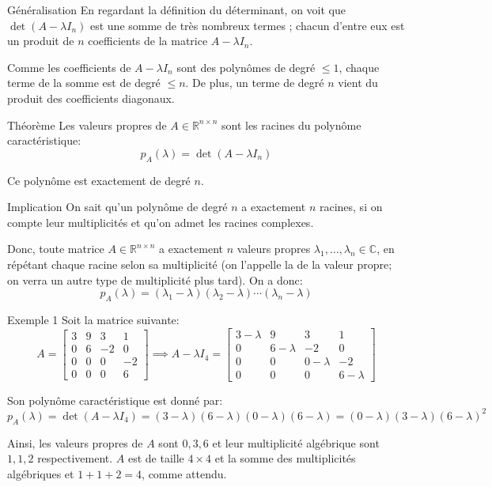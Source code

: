 \documentclass[a4paper]{article}
\begin{document}
\begin{parag}{Généralisation}
    En regardant la définition du déterminant, on voit que $\det\left(A - \lambda I_n\right)$ est une somme de très nombreux termes ; chacun d'entre eux est un produit de $n$ coefficients de la matrice $A - \lambda I_n$. 

    Comme les coefficients de $A - \lambda I_n$ sont des polynômes de degré $\leq 1$, chaque terme de la somme est de degré $\leq n$. De plus, un terme de degré $n$ vient du produit des coefficients diagonaux.
\end{parag}

\begin{parag}{Théorème}
    Les valeurs propres de $A \in \mathbb{R}^{n \times n}$ sont les racines du polynôme caractéristique: 
    \[p_A\left(\lambda\right) = \det\left(A - \lambda I_n\right)\]
    
    Ce polynôme est exactement de degré $n$.

    \begin{subparag}{Implication}
        On sait qu'un polynôme de degré $n$ a exactement $n$ racines, si on compte leur multiplicités et qu'on admet les racines complexes.

        Donc, toute matrice $A \in \mathbb{R}^{n \times n}$ a exactement $n$ valeurs propres $\lambda_1, \ldots, \lambda_n \in \mathbb{C}$, en répétant chaque racine selon sa multiplicité (on l'appelle la  de la valeur propre; on verra un autre type de multiplicité plus tard). On a donc: 
        \[p_A\left(\lambda\right) = \left(\lambda_1 - \lambda\right)\left(\lambda_2 - \lambda\right)\cdots\left(\lambda_n - \lambda\right)\]
    \end{subparag}
\end{parag}

\begin{parag}{Exemple 1}
    Soit la matrice suivante: 
    \[A = \begin{bmatrix} 3 & 9 & 3 & 1 \\ 0 & 6 & -2 & 0 \\ 0 & 0 & 0 & -2 \\ 0 & 0 & 0 & 6 \end{bmatrix} \implies A - \lambda I_4 = \begin{bmatrix} 3-\lambda & 9 & 3 & 1 \\ 0 & 6-\lambda & -2 & 0 \\ 0 & 0 & 0-\lambda & -2 \\ 0 & 0 & 0 & 6-\lambda \end{bmatrix}\]

    Son polynôme caractéristique est donné par:
    \[p_A\left(\lambda\right) = \det\left(A - \lambda I_4\right) = \left(3 - \lambda\right)\left(6 - \lambda\right)\left(0 - \lambda\right)\left(6 - \lambda\right) = \left(0 - \lambda\right)\left(3 - \lambda\right)\left(6 - \lambda\right)^2\]

    Ainsi, les valeurs propres de $A$ sont $0, 3, 6$ et leur multiplicité algébrique sont $1, 1, 2$ respectivement. $A$ est de taille $4\times 4$ et la somme des multiplicités algébriques et $1 + 1 + 2 = 4$, comme attendu.
\end{parag}
\end{document}
